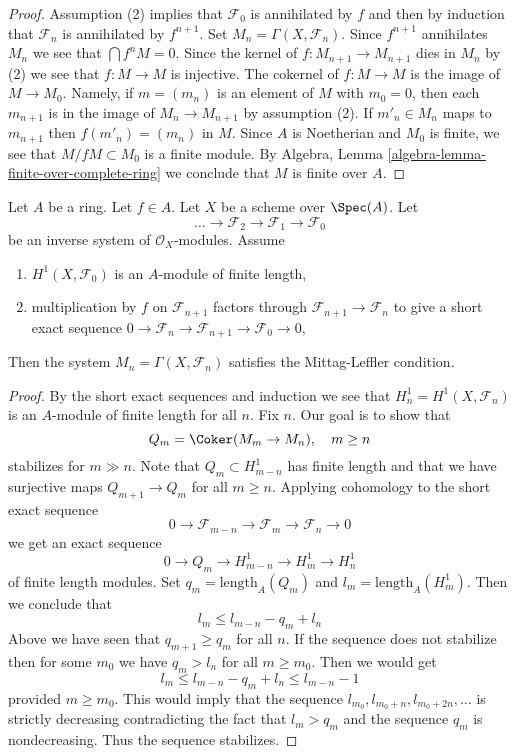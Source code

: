 \begin{proof}
Assumption (2) implies that $\mathcal{F}_0$ is annihilated by $f$
and then by induction that $\mathcal{F}_n$ is annihilated by $f^{n + 1}$.
Set $M_n = \Gamma(X, \mathcal{F}_n)$. Since $f^{n + 1}$ annihilates
$M_n$ we see that $\bigcap f^nM = 0$. Since the kernel of
$f : M_{n + 1} \to M_{n + 1}$ dies in $M_n$ by (2) we see that
$f : M \to M$ is injective. The cokernel of $f : M \to M$
is the image of $M \to M_0$. Namely, if $m = (m_n)$ is an element
of $M$ with $m_0 = 0$, then each $m_{n + 1}$ is in the image of
$M_n \to M_{n + 1}$ by assumption (2).
If $m'_n \in M_n$ maps to $m_{n + 1}$ then $f(m'_n) = (m_n)$ in $M$.
Since $A$ is Noetherian and $M_0$ is finite, we see that
$M/fM \subset M_0$ is a finite module. By
Algebra, Lemma \ref{algebra-lemma-finite-over-complete-ring}
we conclude that $M$ is finite over $A$.
\end{proof}

\begin{lemma}
\label{lemma-ML}
Let $A$ be a ring. Let $f \in A$. Let $X$ be a scheme over $\Spec(A)$. Let
$$
\ldots \to \mathcal{F}_2 \to \mathcal{F}_1 \to \mathcal{F}_0
$$
be an inverse system of $\mathcal{O}_X$-modules. Assume
\begin{enumerate}
\item $H^1(X, \mathcal{F}_0)$ is an $A$-module of finite length,
\item multiplication by $f$ on $\mathcal{F}_{n + 1}$ factors
through $\mathcal{F}_{n + 1} \to \mathcal{F}_n$ to give a
short exact sequence
$0 \to \mathcal{F}_n \to \mathcal{F}_{n + 1} \to \mathcal{F}_0 \to 0$,
\end{enumerate}
Then the system $M_n = \Gamma(X, \mathcal{F}_n)$ satisfies the
Mittag-Leffler condition.
\end{lemma}

\begin{proof}
By the short exact sequences and induction we see that
$H^1_n = H^1(X, \mathcal{F}_n)$ is an $A$-module of finite
length for all $n$. Fix $n$. Our goal is to show that
$$
Q_m = \Coker(M_m \to M_n),\quad m \geq n
$$
stabilizes for $m \gg n$. Note that $Q_m \subset H^1_{m - n}$ has finite length
and that we have surjective maps $Q_{m + 1} \to Q_m$ for all $m \geq n$.
Applying cohomology to the short exact sequence
$$
0 \to \mathcal{F}_{m - n} \to \mathcal{F}_m \to \mathcal{F}_n \to 0
$$
we get an exact sequence
$$
0 \to Q_m \to H^1_{m - n} \to H^1_m \to H^1_n
$$
of finite length modules.
Set $q_m = \text{length}_A(Q_m)$ and $l_m = \text{length}_A(H^1_m)$.
Then we conclude that
$$
l_m \leq l_{m - n} - q_m + l_n
$$
Above we have seen that $q_{m + 1} \geq q_m$ for all $n$. If the sequence
does not stabilize then for some $m_0$ we have $q_m > l_n$ for all
$m \geq m_0$. Then we would get
$$
l_m \leq l_{m - n} - q_m + l_n \leq l_{m - n} - 1
$$
provided $m \geq m_0$. This would imply that the sequence
$l_{m_0}, l_{m_0 + n}, l_{m_0 + 2n}, \ldots$ is strictly decreasing
contradicting the fact that $l_m > q_m$ and the sequence $q_m$
is nondecreasing. Thus the sequence stabilizes.
\end{proof}

